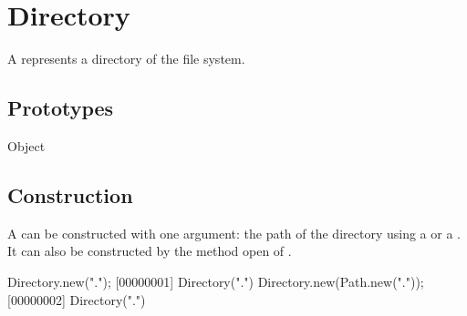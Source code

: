 
\section{Directory}

A  represents a directory of the file system.

\subsection{Prototypes}
\begin{refObjects}
\item[Object]
\end{refObjects}

\subsection{Construction}

A  can be constructed with one argument: the path of
the directory using a  or a . It can
also be constructed by the method open of .

\begin{urbiscript}
Directory.new(".");
[00000001] Directory(".")
Directory.new(Path.new("."));
[00000002] Directory(".")
\end{urbiscript}

